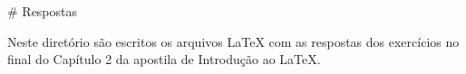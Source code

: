 # Respostas

Neste diretório são escritos os arquivos LaTeX com as respostas dos exercícios no final do Capítulo 2 da apostila de Introdução ao LaTeX.
